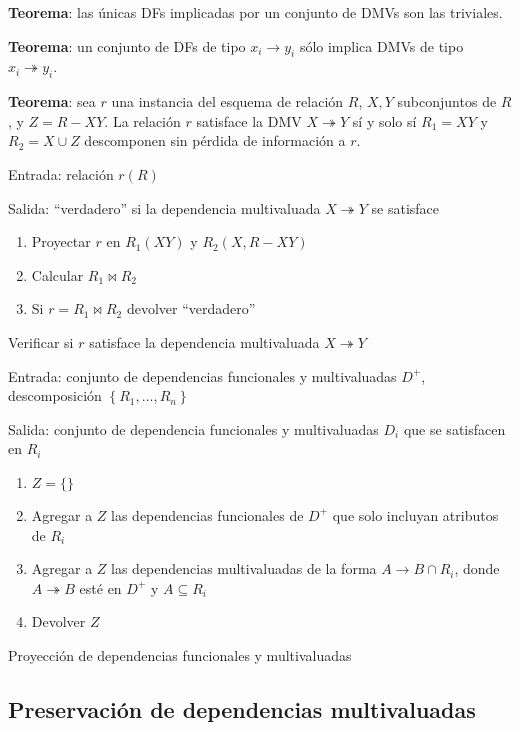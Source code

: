 \documentclass[a4paper, twoside]{article}
\begin{document}
\textbf{Teorema}: las únicas DFs implicadas por un conjunto de DMVs
son las triviales.

\textbf{Teorema}: un conjunto de DFs de tipo $x_{i}\to y_{i}$ sólo
implica DMVs de tipo $x_{i}\twoheadrightarrow y_{i}$.

\textbf{Teorema}: sea $r$ una instancia del esquema de relación $R$,
$X,Y$ subconjuntos de $R$, y $Z=R-XY$. La relación $r$ satisface
la DMV $X\twoheadrightarrow Y$ sí y solo sí $R_{1}=XY$ y $R_{2}=X\cup Z$
descomponen sin pérdida de información a $r$.

\begin{algorithm}[H]
Entrada: relación $r(R)$

Salida: ``verdadero'' si la dependencia multivaluada $X\twoheadrightarrow Y$
se satisface
\begin{enumerate}
\item Proyectar $r$ en $R_{1}(XY)$ y $R_{2}(X,R-XY)$
\item Calcular $R_{1}\bowtie R_{2}$
\item Si $r=R_{1}\bowtie R_{2}$ devolver ``verdadero''
\end{enumerate}
\protect\caption{Verificar si $r$ satisface la dependencia multivaluada $X\twoheadrightarrow Y$}
\end{algorithm}


\begin{algorithm}[H]
Entrada: conjunto de dependencias funcionales y multivaluadas $D^{+}$,
descomposición $\left\{ R_{1},\ldots,R_{n}\right\} $

Salida: conjunto de dependencia funcionales y multivaluadas $D_{i}$
que se satisfacen en $R_{i}$
\begin{enumerate}
\item $Z=\{\}$
\item Agregar a $Z$ las dependencias funcionales de $D^{+}$ que solo incluyan
atributos de $R_{i}$
\item Agregar a $Z$ las dependencias multivaluadas de la forma $A\to B\cap R_{i}$,
donde $A\twoheadrightarrow B$ esté en $D^{+}$ y $A\subseteq R_{i}$
\item Devolver $Z$
\end{enumerate}
\protect\caption{Proyección de dependencias funcionales y multivaluadas}
\end{algorithm}



\subsection{Preservación de dependencias multivaluadas}
\end{document}
